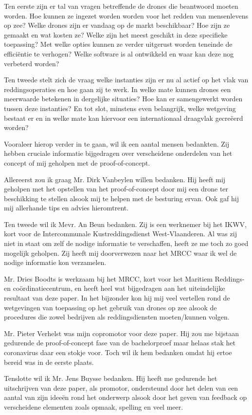 Ten eerste zijn er tal van vragen betreffende de drones die beantwoord moeten worden. Hoe kunnen ze ingezet worden worden voor het redden van mensenlevens op zee? Welke drones zijn er vandaag op de markt beschikbaar? Hoe zijn ze gemaakt en wat kosten ze? Welke zijn het meest geschikt in deze specifieke toepassing? Met welke opties kunnen ze verder uitgerust worden teneinde de efficiëntie te verhogen? Welke software is al ontwikkeld en waar kan deze nog verbeterd worden? 

Ten tweede stelt zich de vraag welke instanties zijn er nu al actief op het vlak van reddingsoperaties en hoe gaan zij te werk. In welke mate kunnen drones een meerwaarde betekenen in dergelijke situaties? Hoe kan er samengewerkt worden tussen deze instanties? En tot slot, minstens even belangrijk, welke wetgeving bestaat er en in welke mate kan hiervoor een internationaal draagvlak gecreëerd worden?

Vooraleer hierop verder in te gaan, wil ik een aantal mensen bedankten. Zij hebben cruciale informatie bijgedragen over verscheidene onderdelen van het concept of mij geholpen met de proof-of-concept.

Allereerst zou ik graag Mr. Dirk Vanbeylen willen bedanken. Hij heeft mij geholpen met het opstellen van het proof-of-concept door mij een drone ter beschikking te stellen alsook mij te helpen met de besturing ervan. Ook gaf hij mij allerhande tips en advies hieromtrent.

Ten tweede wil ik Mevr. An Beun bedanken. Zij is een werknemer bij het IKWV, kort voor de Intercommunale Kustreddingsdienst West-Vlaanderen. Al was zij niet in staat om zelf de nodige informatie te verschaffen, heeft ze me toch zo goed mogelijk geholpen. Zij heeft mij doorverwezen naar het MRCC waar ik wel de nodige informatie kon verzamelen.

Mr. Dries Boodts is werkzaam bij het MRCC, kort voor het Maritiem Reddings- en coördinatiecentrum, en heeft heel wat bijgedragen aan het uiteindelijke resultaat van deze paper. In het bijzonder kon hij mij veel vertellen rond de wetgevingen van toepassing op het gebruik van drones op zee alsook de procedures die zowel bedrijven als reddingsdiensten moeten/kunnen volgen. 

Mr. Pieter Verhelst was mijn copromotor voor deze paper. Hij zou me bijstaan gedurende de proof-of-concept fase van de bachelorproef maar helaas stak het coronavirus daar een stokje voor. Toch wil ik hem bedanken omdat hij ertoe bereid was in de eerste plaats.

Tenslotte wil ik Mr. Jens Buysse bedanken. Hij heeft me gedurende het uitschrijven van deze paper, als promotor, ondersteund door het delen van een aantal van zijn ideeën rond het onderwerp alsook door het geven van feedback op verscheidene elementen zoals opmaak, spelling en veel meer.


